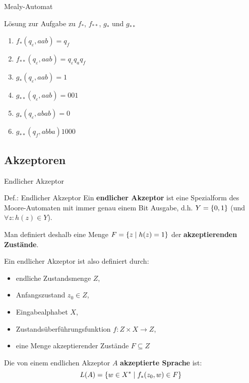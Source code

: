 \begin{frame}{Mealy-Automat}
	\begin{block}{Lösung zur Aufgabe zu $f_{\ast}$, $f_{\ast\ast}$, $g_{\ast}$ und $g_{\ast\ast}$}
		\begin{enumerate}
					\item $f_{\ast}(q_{\varepsilon}, aab) = q_{f}$
					\item $f_{\ast\ast}(q_{\varepsilon}, aab) = q_{\varepsilon}q_{a}q_{f}$

					\item $g_{\ast}(q_{\varepsilon}, aab) = 1$
					\item $g_{\ast\ast}(q_{\varepsilon}, aab) = 001$
					\item $g_{\ast}(q_{\varepsilon}, abab) = 0$
					\item $g_{\ast\ast}(q_{f}, abba) 1000$
			\end{enumerate}
	\end{block}
\end{frame}

\subsection{Akzeptoren}
\begin{frame}{Endlicher Akzeptor}
	\begin{block}{Def.: Endlicher Akzeptor}
		Ein \textbf{endlicher Akzeptor} ist eine Spezialform des Moore-Automaten mit immer genau einem Bit Ausgabe, d.h. $Y = \left\{ 0,1 \right\}$ (und $\forall z : h(z) \in Y$).

		Man definiert deshalb eine Menge $F = \left\{ z \mid h(z)=1 \right\}$ der \textbf{akzeptierenden Zustände}.

		Ein endlicher Akzeptor ist also definiert durch:

		\begin{itemize}
			\item endliche Zustandsmenge $Z$,
			\item Anfangszustand $z_0 \in Z$,
			\item Eingabealphabet $X$,
			\item Zustandsüberführungsfunktion $f: Z \times X \rightarrow Z$,
			\item eine Menge akzeptierender Zustände $F \subseteq Z$
		\end{itemize}
		Die von einem endlichen Akzeptor $A$ \textbf{akzeptierte Sprache} ist:
		\[
			L(A) = \left\{ w \in X^{\ast} \mid f_{\ast}(z_{0},w) \in F \right\}
		\]
	\end{block}
\end{frame}

